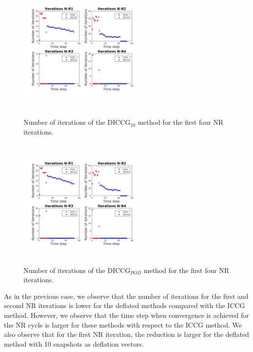 \documentclass[12pt]{article}
\begin{document}
\begin{figure}[!h]
\centering
\begin{minipage}{.4\textwidth}
 \centering
\includegraphics[width=6.5cm,height=6.5cm,keepaspectratio]
{iterations_4NRvw_D10.jpg}
\caption{Number of iterations of the DICCG$_{10}$ method for the first four NR iterations.}
\label{fig:vwNR_D10}
\end{minipage}%
\hspace{15mm}
\begin{minipage}{.4\textwidth}
 \centering
\includegraphics[width=6.5cm,height=6.5cm,keepaspectratio]
{iterations_4NRvw_POD5.jpg}
\caption{Number of iterations of the DICCG$_{POD}$ method for the first four NR iterations.}
\label{fig:vwNR_POD5}
\end{minipage}
\end{figure}
As in the previous case, we observe that the number of iterations for the first and second NR iterations is lower for the deflated methods compared with the ICCG method. However, we observe that the time step when convergence is achieved for the NR cycle is larger for these methods with respect to the ICCG method. We also observe that for the first NR iteration, the reduction is larger for the deflated method with 10 snapshots as deflation vectors.


\newpage
\newpage


\end{document}
